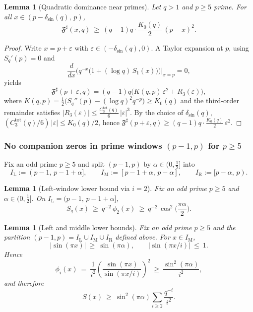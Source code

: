 \documentclass[11pt,a4paper]{amsart}
\newcommand{\Fbase}{\mathfrak F}
\newcommand{\Fsharp}{\Fbase^{\sharp}}
\theoremstyle{plain}
\newtheorem{lemma}[theorem]{Lemma}
\theoremstyle{definition}
\theoremstyle{remark}
\begin{document}
\begin{lemma}[Quadratic dominance near primes]\label{lem:quadratic-dominance}
Let $q>1$ and $p\ge5$ prime. For all $x\in(p-\delta_{\sin}(q),\,p)$,
\[
\Fsharp(x,q)\ \ge\ (q-1)q\cdot \frac{K_0(q)}{2}\,(p-x)^2 .
\]
\end{lemma}
\begin{proof}
Write $x=p+\varepsilon$ with $\varepsilon\in(-\delta_{\sin}(q),0)$.
A Taylor expansion at $p$, using $S_q'(p)=0$ and
\[
\frac{d}{dx}\Big(q^{-x}\big(1+(\log q)\,S_1(x)\big)\Big)\Big|_{x=p}=0,
\]
yields
\[
\Fsharp(p+\varepsilon,q)=(q-1)q\Big(K(q,p)\,\varepsilon^2 + R_3(\varepsilon)\Big),
\]
where $K(q,p)=\tfrac12\big(S_q''(p)-(\log q)^2 q^{-p}\big)\ge K_0(q)$ and the third-order remainder satisfies
$|R_3(\varepsilon)|\le \frac{C_3^{\mathrm{tot}}(q)}{6}\,|\varepsilon|^3$.
By the choice of $\delta_{\sin}(q)$, $(C_3^{\mathrm{tot}}(q)/6)\,|\varepsilon|\le K_0(q)/2$, hence
\(
\Fsharp(p+\varepsilon,q)\ge (q-1)q\cdot \frac{K_0(q)}{2}\,\varepsilon^2.
\)
\end{proof}

\subsubsection{No companion zeros in prime windows \texorpdfstring{$(p-1,p)$}{(p-1,p)} for \texorpdfstring{$p\ge5$}{p≥5}}

Fix an odd prime $p\ge5$ and split $(p-1,p)$ by $\alpha\in(0,\tfrac12]$ into
\[
I_{\mathrm L}:=(p-1,\,p-1+\alpha],\qquad
I_{\mathrm M}:=[p-1+\alpha,\,p-\alpha],\qquad
I_{\mathrm R}:=[p-\alpha,\,p).
\]

\begin{lemma}[Left-window lower bound via $i=2$]\label{lem:left-only}
Fix an odd prime $p\ge5$ and $\alpha\in(0,\tfrac12]$. On $I_{\mathrm L}=(p-1,\,p-1+\alpha]$,
\[
S_q(x)\ \ge\ q^{-2}\,\phi_2(x)\ \ge\ q^{-2}\,\cos^2\!\Big(\frac{\pi\alpha}{2}\Big).
\]
\end{lemma}

\begin{lemma}[Left and middle lower bounds]\label{lem:left-middle}
Fix an odd prime $p\ge5$ and the partition $(p-1,p)=I_{\mathrm L}\cup I_{\mathrm M}\cup I_{\mathrm R}$ defined above. 
For $x\in I_{\mathrm M}$,
\[
|\sin(\pi x)|\ \ge\ \sin(\pi\alpha),\qquad 
|\sin(\pi x/i)|\ \le\ 1.
\]
Hence
\[
\phi_i(x)\ =\ \frac{1}{i^2}\left(\frac{\sin(\pi x)}{\sin(\pi x/i)}\right)^{\!2}
\ \ge\ \frac{\sin^2(\pi\alpha)}{i^2},
\]
and therefore
\[
S(x)\ \ge\ \sin^2(\pi\alpha)\sum_{i\ge2}\frac{q^{-i}}{i^2}.
\]
\end{lemma}
\end{document}

